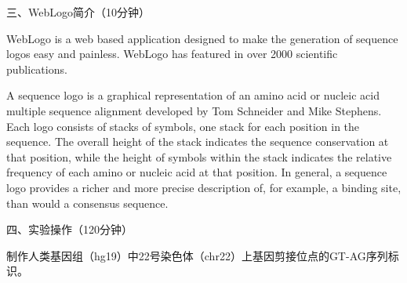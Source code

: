 \documentclass{TIJMUjiaoanSY}
\begin{document}
\vspace*{0.2cm}
\noindent
三、WebLogo简介（10分钟）

WebLogo is a web based application designed to make the generation of sequence logos easy and painless. WebLogo has featured in over 2000 scientific publications.

A sequence logo is a graphical representation of an amino acid or nucleic acid multiple sequence alignment developed by Tom Schneider and Mike Stephens. Each logo consists of stacks of symbols, one stack for each position in the sequence. The overall height of the stack indicates the sequence conservation at that position, while the height of symbols within the stack indicates the relative frequency of each amino or nucleic acid at that position. In general, a sequence logo provides a richer and more precise description of, for example, a binding site, than would a consensus sequence.

\otherTail
\newpage
\otherHeader

\noindent
四、实验操作（120分钟）

制作人类基因组（hg19）中22号染色体（chr22）上基因剪接位点的GT-AG序列标识。
\end{document}
